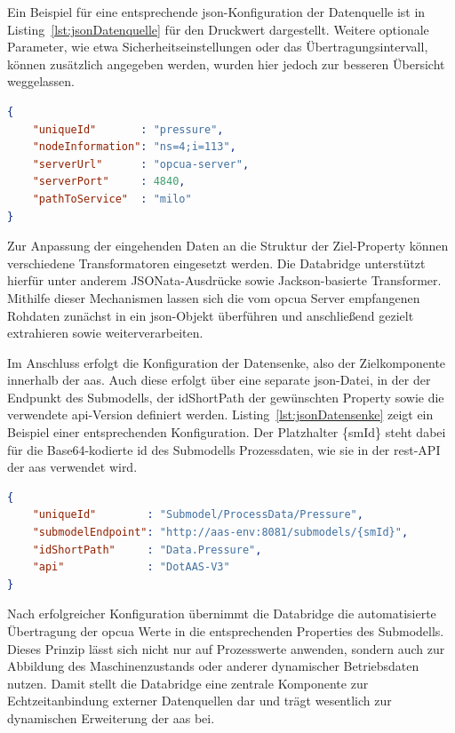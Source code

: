 Ein Beispiel für eine entsprechende \acs{json}-Konfiguration der Datenquelle ist in Listing~\ref{lst:jsonDatenquelle} für den Druckwert dargestellt.
Weitere optionale Parameter, wie etwa Sicherheitseinstellungen oder das Übertragungsintervall, können zusätzlich angegeben werden, wurden hier jedoch zur besseren Übersicht weggelassen.

\begin{lstlisting}[language=json, caption={\acs{json}-Konfiguration einer Datenquelle}, label={lst:jsonDatenquelle}]
{
    "uniqueId"       : "pressure",
    "nodeInformation": "ns=4;i=113",
    "serverUrl"      : "opcua-server",
    "serverPort"     : 4840,
    "pathToService"  : "milo"
}
\end{lstlisting}

Zur Anpassung der eingehenden Daten an die Struktur der Ziel-Property können verschiedene Transformatoren eingesetzt werden.
Die Databridge unterstützt hierfür unter anderem JSONata-Ausdrücke sowie Jackson-basierte Transformer.
Mithilfe dieser Mechanismen lassen sich die vom \acs{opcua} Server empfangenen Rohdaten zunächst in ein \acs{json}-Objekt überführen und anschließend gezielt extrahieren sowie weiterverarbeiten.

Im Anschluss erfolgt die Konfiguration der Datensenke, also der Zielkomponente innerhalb der \acs{aas}.
Auch diese erfolgt über eine separate \acs{json}-Datei, in der der Endpunkt des Submodells, der idShortPath der gewünschten Property sowie die verwendete \acs{api}-Version definiert werden.
Listing~\ref{lst:jsonDatensenke} zeigt ein Beispiel einer entsprechenden Konfiguration.
Der Platzhalter \{smId\} steht dabei für die Base64-kodierte \acs{id} des Submodells Prozessdaten, wie sie in der \acs{rest}-API der \acs{aas} verwendet wird.

\newpage
\begin{lstlisting}[language=json, caption={\acs{json}-Konfiguration einer Datensenke}, label={lst:jsonDatensenke}]
{
    "uniqueId"        : "Submodel/ProcessData/Pressure",
    "submodelEndpoint": "http://aas-env:8081/submodels/{smId}",
    "idShortPath"     : "Data.Pressure",
    "api"             : "DotAAS-V3"
}
\end{lstlisting}

Nach erfolgreicher Konfiguration übernimmt die Databridge die automatisierte Übertragung der \acs{opcua} Werte in die entsprechenden Properties des Submodells.
Dieses Prinzip lässt sich nicht nur auf Prozesswerte anwenden, sondern auch zur Abbildung des Maschinenzustands oder anderer dynamischer Betriebsdaten nutzen.
Damit stellt die Databridge eine zentrale Komponente zur Echtzeitanbindung externer Datenquellen dar und trägt wesentlich zur dynamischen Erweiterung der \acs{aas} bei.

